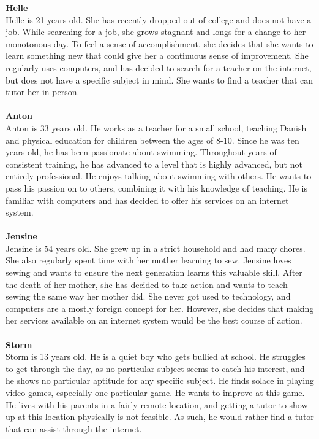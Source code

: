 \textbf{Helle}
\\
Helle is 21 years old.
She has recently dropped out of college and does not have a job.
While searching for a job, she grows stagnant and longs for a change to her monotonous day.
To feel a sense of accomplishment, she decides that she wants to learn something new that could give her a continuous sense of improvement.
She regularly uses computers, and has decided to search for a teacher on the internet, but does not have a specific subject in mind.
She wants to find a teacher that can tutor her in person.
\\\\
\textbf{Anton}
\\
Anton is 33 years old.
He works as a teacher for a small school, teaching Danish and physical education for children between the ages of 8-10.
Since he was ten years old, he has been passionate about swimming.
Throughout years of consistent training, he has advanced to a level that is highly advanced, but not entirely professional.
He enjoys talking about swimming with others.
He wants to pass his passion on to others, combining it with his knowledge of teaching.
He is familiar with computers and has decided to offer his services on an internet system.
\\\\
\textbf{Jensine}
\\
Jensine is 54 years old.
She grew up in a strict household and had many chores.
She also regularly spent time with her mother learning to sew.
Jensine loves sewing and wants to ensure the next generation learns this valuable skill.
After the death of her mother, she has decided to take action and wants to teach sewing the same way her mother did.
She never got used to technology, and computers are a mostly foreign concept for her.
However, she decides that making her services available on an internet system would be the best course of action.
\\\\
\textbf{Storm}
\\
Storm is 13 years old.
He is a quiet boy who gets bullied at school. 
He struggles to get through the day, as no particular subject seems to catch his interest, and he shows no particular aptitude for any specific subject.
He finds solace in playing video games, especially one particular game. 
He wants to improve at this game.
He lives with his parents in a fairly remote location, and getting a tutor to show up at this location physically is not feasible.
As such, he would rather find a tutor that can assist through the internet.
